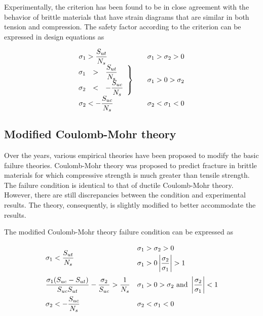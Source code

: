 \documentclass[
10pt,
a4paper,
openany,
svgnames,
]{kaobook} %
\begin{document}
Experimentally, the criterion has been found to be in close agreement with the behavior of brittle materials that have strain diagrams that are similar in both tension and compression. The safety factor according to the criterion can be expressed in design equations as

\begin{equation}
  \begin{array}{l l l}
  \sigma_1 > \dfrac{S_{ut}}{N_s} & & \sigma_1 > \sigma_2 > 0 \\
  \left. \hspace{-0.23cm}
  \begin{array}{l l l}
    \sigma_1 & > & \dfrac{S_{ut}}{N_s} \\
    \sigma_2 & < & -\dfrac{S_{uc}}{N_s}
    \end{array} \right\} & & \sigma_1 > 0 > \sigma_2 \\
    \sigma_2 <  - \dfrac{S_{uc}}{N_s} & & \sigma _2 < \sigma _1 < 0
  \end{array}
\end{equation}

\subsection{Modified Coulomb-Mohr theory}

Over the years, various empirical theories have been proposed to modify the basic failure theories. Coulomb-Mohr theory was proposed to predict fracture in brittle materials for which compressive strength is much greater than tensile strength. The failure condition is identical to that of ductile Coulomb-Mohr theory. However, there are still discrepancies between the condition and experimental results. The theory, consequently, is slightly modified to better accommodate the results.

The modified Coulomb-Mohr theory failure condition can be expressed as

\begin{equation}
  \begin{array}{ll}
    \sigma_1 < \dfrac{S_{ut}}{N_s} &
      \begin{gathered}
        \sigma_1 > \sigma_2 > 0 \hfill \\ 
        \sigma_1 > 0 \left| \dfrac{\sigma_2}{\sigma_1} \right| > 1 
      \end{gathered} \\[20pt]
    \dfrac{\sigma_1(S_{uc} - S_{ut})}{S_{uc}S_{ut}} - \dfrac{\sigma_2}{S_{uc}} > \dfrac{1}{N_s} & \sigma_1 > 0 > \sigma_2\text{ and }\left| \dfrac{\sigma_2}{\sigma_1} \right| < 1 \\[10pt]
    \sigma_2 <  -\dfrac{S_{uc}}{N_s} & \sigma_2 < \sigma_1 < 0
  \end{array}
\end{equation}
\end{document}
